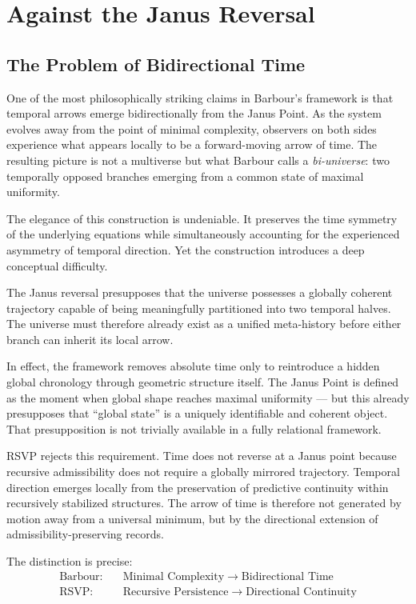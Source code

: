 \documentclass[12pt, a4paper]{article}
\begin{document}
\section{Against the Janus Reversal}

\subsection{The Problem of Bidirectional Time}

One of the most philosophically striking claims in Barbour's framework is
that temporal arrows emerge bidirectionally from the Janus Point. As the
system evolves away from the point of minimal complexity, observers on both
sides experience what appears locally to be a forward-moving arrow of time.
The resulting picture is not a multiverse but what Barbour calls a
\emph{bi-universe}: two temporally opposed branches emerging from a common
state of maximal uniformity.

The elegance of this construction is undeniable. It preserves the time
symmetry of the underlying equations while simultaneously accounting for the
experienced asymmetry of temporal direction. Yet the construction introduces
a deep conceptual difficulty.

The Janus reversal presupposes that the universe possesses a globally
coherent trajectory capable of being meaningfully partitioned into two
temporal halves. The universe must therefore already exist as a unified
meta-history before either branch can inherit its local arrow.

In effect, the framework removes absolute time only to reintroduce a hidden
global chronology through geometric structure itself. The Janus Point is
defined as the moment when global shape reaches maximal uniformity — but
this already presupposes that ``global state'' is a uniquely identifiable and
coherent object. That presupposition is not trivially available in a fully
relational framework.

RSVP rejects this requirement. Time does not reverse at a Janus point
because recursive admissibility does not require a globally mirrored
trajectory. Temporal direction emerges locally from the preservation of
predictive continuity within recursively stabilized structures. The arrow of
time is therefore not generated by motion away from a universal minimum, but
by the directional extension of admissibility-preserving records.

The distinction is precise:
\begin{align*}
\text{Barbour:}&\quad \text{Minimal Complexity} \;\longrightarrow\; \text{Bidirectional Time} \\
\text{RSVP:}&\quad \text{Recursive Persistence} \;\longrightarrow\; \text{Directional Continuity}
\end{align*}
\end{document}
